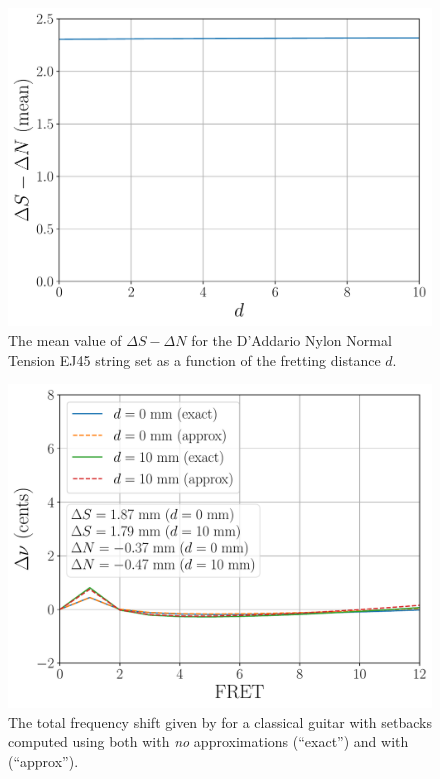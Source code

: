 \begin{figure}
  \centering
  \includegraphics[width=5.0in]{figures/dsnd_ej45}
  \caption{\label{fig:dsnd_ej45} The mean value of $\Delta S - \Delta N$ for the D'Addario Nylon Normal Tension EJ45 string set as a function of the fretting distance $d$.}
\end{figure}

\begin{figure}
  \centering
  \includegraphics[width=5.0in]{figures/comp_exact}
  \caption{\label{fig:comp_exact} The total frequency shift given by  for a classical guitar with setbacks computed using both  with \emph{no} approximations (``exact'') and  with  (``approx'').}
\end{figure}

